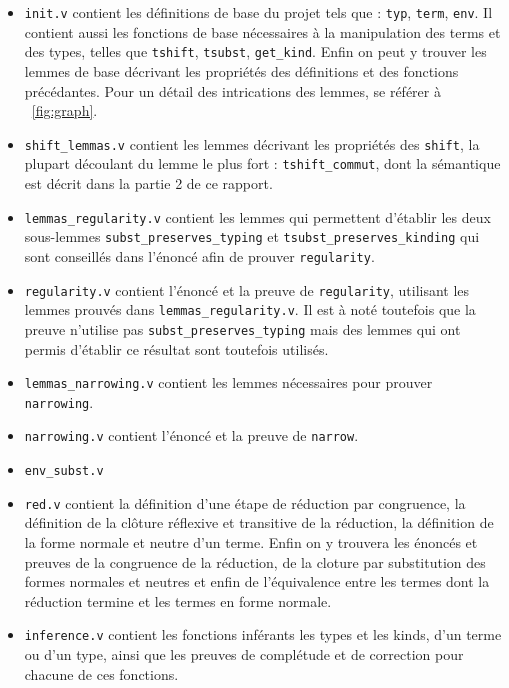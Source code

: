 \documentclass[a4paper,10pt]{scrartcl}
\begin{document}
     \begin{itemize}
      \item \texttt{init.v} contient les définitions de base du projet tels que : \texttt{typ}, \texttt{term}, \texttt{env}. Il contient aussi les fonctions de base nécessaires à la manipulation des terms et des types, telles que \texttt{tshift}, \texttt{tsubst}, \texttt{get\_kind}. Enfin on peut y trouver les lemmes de base décrivant les propriétés des définitions et des fonctions précédantes. Pour un détail des intrications des lemmes, se référer à ~\ref{fig:graph}.
      \item \texttt{shift\_lemmas.v} contient les lemmes décrivant les propriétés des \texttt{shift}, la plupart découlant du lemme le plus fort : \texttt{tshift\_commut}, dont la sémantique est décrit dans la partie 2 de ce rapport.
      \item \texttt{lemmas\_regularity.v} contient les lemmes qui permettent d'établir les deux sous-lemmes \texttt{subst\_preserves\_typing} et \texttt{tsubst\_preserves\_kinding} qui sont conseillés dans l'énoncé afin de prouver \texttt{regularity}.
      \item \texttt{regularity.v} contient l'énoncé et la preuve de \texttt{regularity}, utilisant les lemmes prouvés dans \texttt{lemmas\_regularity.v}. Il est à noté toutefois que la preuve n'utilise pas \texttt{subst\_preserves\_typing} mais des lemmes qui ont permis d'établir ce résultat sont toutefois utilisés.
      \item \texttt{lemmas\_narrowing.v} contient les lemmes nécessaires pour prouver \texttt{narrowing}.
      \item \texttt{narrowing.v} contient l'énoncé et la preuve de \texttt{narrow}.
      \item \texttt{env\_subst.v}
      \item \texttt{red.v} contient la définition d'une étape de réduction par congruence, la définition de la clôture réflexive et transitive de la réduction, la définition de la forme normale et neutre d'un terme. Enfin on y trouvera les énoncés et preuves de la congruence de la réduction, de la cloture par substitution des formes normales et neutres et enfin de l'équivalence entre les termes dont la réduction termine et les termes en forme normale.
      \item \texttt{inference.v} contient les fonctions inférants les types et les kinds, d'un terme ou d'un type, ainsi que les preuves de complétude et de correction pour chacune de ces fonctions.
     \end{itemize}
\end{document}
